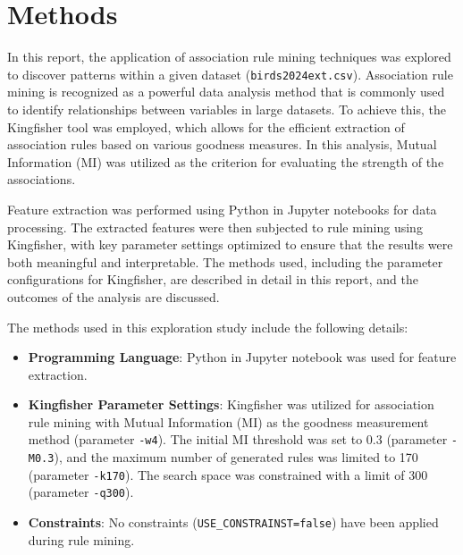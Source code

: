 \section{Methods}

In this report, the application of association rule mining techniques was explored to discover patterns within a given dataset (\texttt{birds2024ext.csv}). Association rule mining is recognized as a powerful data analysis method that is commonly used to identify relationships between variables in large datasets. To achieve this, the Kingfisher tool was employed, which allows for the efficient extraction of association rules based on various goodness measures. In this analysis, Mutual Information (MI) was utilized as the criterion for evaluating the strength of the associations.

Feature extraction was performed using Python in Jupyter notebooks for data processing. The extracted features were then subjected to rule mining using Kingfisher, with key parameter settings optimized to ensure that the results were both meaningful and interpretable. The methods used, including the parameter configurations for Kingfisher, are described in detail in this report, and the outcomes of the analysis are discussed.

The methods used in this exploration study include the following details:

\begin{itemize}

    \item \textbf{Programming Language}: Python in Jupyter notebook was used for feature extraction.

    \item \textbf{Kingfisher Parameter Settings}: Kingfisher was utilized for association rule mining with Mutual Information (MI) as the goodness measurement method (parameter \texttt{-w4}). The initial MI threshold was set to 0.3 (parameter \texttt{-M0.3}), and the maximum number of generated rules was limited to 170 (parameter \texttt{-k170}). The search space was constrained with a limit of 300 (parameter \texttt{-q300}).

    \item \textbf{Constraints}: No constraints (\texttt{USE\_CONSTRAINST=false}) have been applied during rule mining.

\end{itemize}
